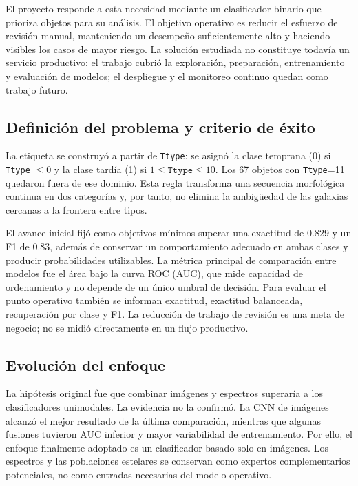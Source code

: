 \documentclass[letterpaper,11pt]{article}
\begin{document}
El proyecto responde a esta necesidad mediante un clasificador binario que prioriza objetos para su análisis. El objetivo operativo es reducir el esfuerzo de revisión manual, manteniendo un desempeño suficientemente alto y haciendo visibles los casos de mayor riesgo. La solución estudiada no constituye todavía un servicio productivo: el trabajo cubrió la exploración, preparación, entrenamiento y evaluación de modelos; el despliegue y el monitoreo continuo quedan como trabajo futuro.

\subsection{Definición del problema y criterio de éxito}

La etiqueta se construyó a partir de \texttt{Ttype}: se asignó la clase temprana (0) si \texttt{Ttype} $\leq 0$ y la clase tardía (1) si $1 \leq \texttt{Ttype} \leq 10$. Los 67 objetos con \texttt{Ttype}=11 quedaron fuera de ese dominio. Esta regla transforma una secuencia morfológica continua en dos categorías y, por tanto, no elimina la ambigüedad de las galaxias cercanas a la frontera entre tipos.

El avance inicial fijó como objetivos mínimos superar una exactitud de 0.829 y un F1 de 0.83, además de conservar un comportamiento adecuado en ambas clases y producir probabilidades utilizables. La métrica principal de comparación entre modelos fue el área bajo la curva ROC (AUC), que mide capacidad de ordenamiento y no depende de un único umbral de decisión. Para evaluar el punto operativo también se informan exactitud, exactitud balanceada, recuperación por clase y F1. La reducción de trabajo de revisión es una meta de negocio; no se midió directamente en un flujo productivo.

\subsection{Evolución del enfoque}

La hipótesis original fue que combinar imágenes y espectros superaría a los clasificadores unimodales. La evidencia no la confirmó. La CNN de imágenes alcanzó el mejor resultado de la última comparación, mientras que algunas fusiones tuvieron AUC inferior y mayor variabilidad de entrenamiento. Por ello, el enfoque finalmente adoptado es un clasificador basado solo en imágenes. Los espectros y las poblaciones estelares se conservan como expertos complementarios potenciales, no como entradas necesarias del modelo operativo.
\end{document}
